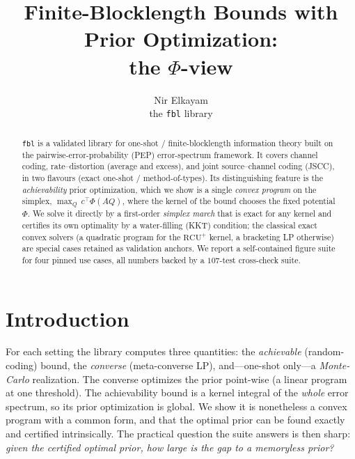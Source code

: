 \documentclass[11pt]{article}
\title{\textbf{Finite-Blocklength Bounds with Prior Optimization:\\ the $\Phi$-view}}
\author{Nir Elkayam \\ \small the \texttt{fbl} library}
\date{}
\newcommand{\Tr}{^{\!\top}}
\begin{document}
\maketitle

\begin{abstract}
\noindent
\texttt{fbl} is a validated library for one-shot / finite-blocklength information
theory built on the pairwise-error-probability (PEP) error-spectrum framework. It
covers channel coding, rate--distortion (average and excess), and joint
source--channel coding (JSCC), in two flavours (exact one-shot / method-of-types).
Its distinguishing feature is the \emph{achievability} prior optimization, which we
show is a single \emph{convex program} on the simplex,
$\max_Q\, c\Tr \Phi(AQ)$, where the kernel of the bound chooses the fixed potential
$\Phi$. We solve it directly by a first-order \emph{simplex march} that is exact for
any kernel and certifies its own optimality by a water-filling (KKT) condition; the
classical exact convex solvers (a quadratic program for the $\mathrm{RCU}^+$ kernel,
a bracketing LP otherwise) are special cases retained as validation anchors. We
report a self-contained figure suite for four pinned use cases, all numbers backed
by a $107$-test cross-check suite.
\end{abstract}

\section{Introduction}
For each setting the library computes three quantities: the \emph{achievable}
(random-coding) bound, the \emph{converse} (meta-converse LP), and---one-shot
only---a \emph{Monte-Carlo} realization. The converse optimizes the prior
point-wise (a linear program at one threshold). The achievability bound is a kernel
integral of the \emph{whole} error spectrum, so its prior optimization is global. We
show it is nonetheless a convex program with a common form, and that the optimal
prior can be found exactly and certified intrinsically. The practical question the
suite answers is then sharp: \emph{given the certified optimal prior, how large is
the gap to a memoryless prior?}
\end{document}
